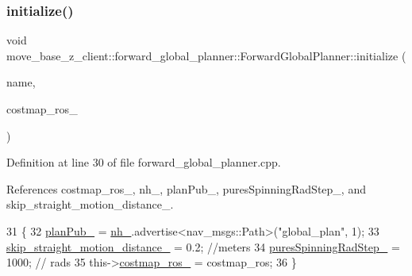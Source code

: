 \subsubsection{\texorpdfstring{initialize()}{initialize()}}
{\footnotesize\ttfamily void move\+\_\+base\+\_\+z\+\_\+client\+::forward\+\_\+global\+\_\+planner\+::\+Forward\+Global\+Planner\+::initialize (\begin{DoxyParamCaption}\item[{std\+::string}]{name,  }\item[{costmap\+\_\+2d\+::\+Costmap2\+D\+R\+OS $\ast$}]{costmap\+\_\+ros\+\_\+ }\end{DoxyParamCaption})}



Definition at line 30 of file forward\+\_\+global\+\_\+planner.\+cpp.



References costmap\+\_\+ros\+\_\+, nh\+\_\+, plan\+Pub\+\_\+, pures\+Spinning\+Rad\+Step\+\_\+, and skip\+\_\+straight\+\_\+motion\+\_\+distance\+\_\+.


\begin{DoxyCode}
31 \{
32     \hyperlink{classmove__base__z__client_1_1forward__global__planner_1_1ForwardGlobalPlanner_a324f5df4d47440e1ebddb83ee53d5908}{planPub\_} = \hyperlink{classmove__base__z__client_1_1forward__global__planner_1_1ForwardGlobalPlanner_a3302fa193a6f9819514bd0990286b197}{nh\_}.advertise<nav\_msgs::Path>(\textcolor{stringliteral}{"global\_plan"}, 1);
33     \hyperlink{classmove__base__z__client_1_1forward__global__planner_1_1ForwardGlobalPlanner_ae33082b9dd81dd3ce8d3e68a6c032c61}{skip\_straight\_motion\_distance\_} = 0.2; \textcolor{comment}{//meters}
34     \hyperlink{classmove__base__z__client_1_1forward__global__planner_1_1ForwardGlobalPlanner_a91bac0160c7b6ea54f4188b60f7fcf89}{puresSpinningRadStep\_} = 1000;         \textcolor{comment}{// rads}
35     this->\hyperlink{classmove__base__z__client_1_1forward__global__planner_1_1ForwardGlobalPlanner_aba11d85f5f4c9370873195ca97497a22}{costmap\_ros\_} = costmap\_ros;
36 \}
\end{DoxyCode}
\mbox{\label{classmove__base__z__client_1_1forward__global__planner_1_1ForwardGlobalPlanner_a2dcf9aad74efaaa92ee78650f7a23096}} 
